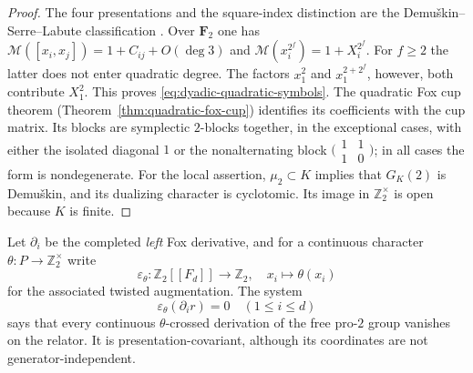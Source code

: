 \documentclass[11pt]{article}
\theoremstyle{definition}
\begin{document}
\begin{proof}
The four presentations and the square-index distinction are
the Demu\v{s}kin--Serre--Labute classification
\cite{LabuteClassification,NSW}.
Over $\mathbf F_2$ one has
$\mathcal M([x_i,x_j])=1+C_{ij}+O(\deg3)$ and
$\mathcal M(x_i^{2^f})=1+X_i^{2^f}$.
For $f\ge2$ the latter does not enter quadratic degree.
The factors $x_1^2$ and $x_1^{2+2^f}$, however,
both contribute $X_1^2$.
This proves \eqref{eq:dyadic-quadratic-symbols}.
The quadratic Fox cup theorem
(Theorem~\ref{thm:quadratic-fox-cup})
identifies its coefficients with the cup matrix.
Its blocks are symplectic $2$-blocks together,
in the exceptional cases, with either the isolated
diagonal $1$ or the nonalternating block
$\bigl(\begin{smallmatrix}1&1\\1&0\end{smallmatrix}\bigr)$;
in all cases the form is nondegenerate.
For the local assertion, $\mu_2\subset K$ implies that
$G_K(2)$ is Demu\v{s}kin, and its dualizing character
is cyclotomic.  Its image in $\mathbb Z_2^\times$ is open
because $K$ is finite.
\end{proof}

Let $\partial_i$ be the completed \emph{left} Fox derivative,
and for a continuous character $\theta:P\to\mathbb Z_2^\times$
write
\[
\varepsilon_\theta:\mathbb Z_2[[F_d]]\longrightarrow\mathbb Z_2,
\quad x_i\longmapsto\theta(x_i)
\]
for the associated twisted augmentation.  The system
\begin{equation}\label{eq:dyadic-twisted-fox-orientation}
\boxed{\quad\varepsilon_\theta(\partial_i r)=0
\quad(1\le i\le d)\quad}
\end{equation}
says that every continuous $\theta$-crossed derivation of
the free pro-$2$ group vanishes on the relator.  It is
presentation-covariant, although its coordinates are not
generator-independent.
\end{document}
